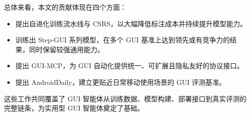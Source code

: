 总体来看，本文的贡献体现在四个方面：
\begin{itemize}
\item 提出自进化训练流水线与 CSRS，以大幅降低标注成本并持续提升模型能力。
\item 训练出 Step-GUI 系列模型，在多个 GUI 基准上达到领先或有竞争力的结果，同时保留较强通用能力。
\item 提出 GUI-MCP，为 GUI 自动化提供统一、可扩展且隐私友好的协议接口。
\item 提出 AndroidDaily，建立更贴近日常移动使用场景的 GUI 评测基准。
\end{itemize}

这些工作共同覆盖了 GUI 智能体从训练数据、模型构建、部署接口到真实评测的完整链条，为实用型 GUI 智能体奠定了基础。
